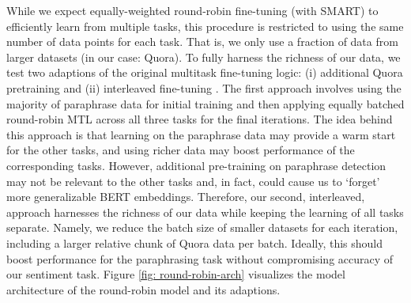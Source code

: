 \documentclass{article}
\begin{document}
While we expect equally-weighted round-robin fine-tuning (with SMART) to efficiently learn from multiple tasks, this procedure is restricted to using the same number of data points for each task. That is, we only use a fraction of data from larger datasets (in our case: Quora). To fully harness the richness of our data, we test two adaptions of the original multitask fine-tuning logic: (i) additional Quora pretraining \cite{pretrain} and (ii) interleaved fine-tuning \cite{MTL}. The first approach involves using the majority of paraphrase data for initial training and then applying equally batched round-robin MTL across all three tasks for the final iterations. The idea behind this approach is that learning on the paraphrase data may provide a warm start for the other tasks, and using richer data may boost performance of the corresponding tasks. However, additional pre-training on paraphrase detection may not be relevant to the other tasks and, in fact, could cause us to `forget' more generalizable BERT embeddings. Therefore, our second, interleaved, approach harnesses the richness of our data while keeping the learning of all tasks separate. Namely, we reduce the batch size of smaller datasets for each iteration, including a larger relative chunk of Quora data per batch. Ideally, this should boost performance for the paraphrasing task without compromising accuracy of our sentiment task. Figure \ref{fig: round-robin-arch} visualizes the model architecture of the round-robin model and its adaptions.
\vspace{-0.3cm}
\end{document}
